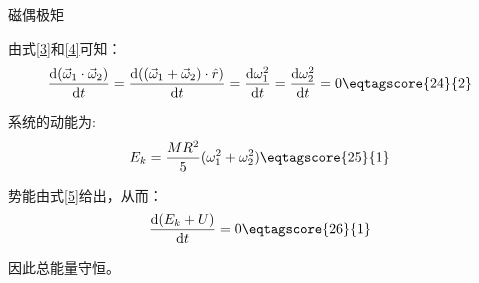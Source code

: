 \documentclass[answer]{cphos}
\begin{document}
\begin{problem}[50]{磁偶极矩}
\begin{solution}
由式\ref{3}和\ref{4}可知：
\begin{equation}
	\frac{\mathrm{d}(\vec{\omega}_1\cdot\vec{\omega}_2)}{\mathrm{d}t}=\frac{\mathrm{d}((\vec{\omega}_1+\vec{\omega}_2)\cdot\hat{r})}{\mathrm{d}t}=\frac{\mathrm{d}\omega_1^2}{\mathrm{d}t}=\frac{\mathrm{d}\omega_2^2}{\mathrm{d}t}=0\eqtagscore{24}{2}
\end{equation}


系统的动能为:
\begin{equation}
	E_k=\frac{MR^2}{5}(\omega_1^2+\omega_2^2)\eqtagscore{25}{1}
\end{equation}

势能由式\ref{5}给出，从而：
\begin{equation}
	\frac{\mathrm{d}(E_k+U)}{\mathrm{d}t}=0\eqtagscore{26}{1}
\end{equation}

因此总能量守恒。

\scoring  %
\end{solution}

\end{problem}
\end{document}
